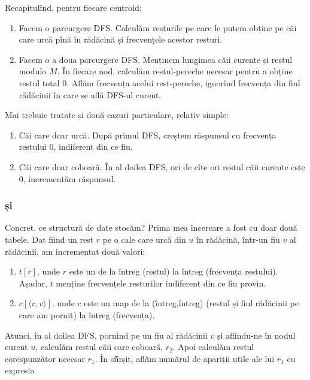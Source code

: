 \documentclass[../main.tex]{subfiles}
\begin{document}
Recapitulînd, pentru fiecare centroid:

\begin{enumerate}
  \item Facem o parcurgere DFS. Calculăm resturile pe care le putem obține pe căi care urcă pînă în rădăcină și frecvențele acestor resturi.

  \item Facem o a doua parcurgere DFS. Menținem lungimea căii curente și restul modulo $M$. În fiecare nod, calculăm restul-pereche necesar pentru a obține restul total 0. Aflăm frecvența acelui rest-pereche, ignorînd frecvența din fiul rădăcinii în care se află DFS-ul curent.
\end{enumerate}

Mai trebuie tratate și două cazuri particulare, relativ simple:

\begin{enumerate}
  \item Căi care doar urcă. După primul DFS, creștem răspunsul cu frecvența restului 0, indiferent din ce fiu.

  \item Căi care doar coboară. În al doilea DFS, ori de cîte ori restul căii curente este 0, incrementăm răspunsul.
\end{enumerate}

\subsubsection*{ și }

Concret, ce structură de date stocăm? Prima mea încercare a fost cu doar două tabele. Dat fiind un rest $r$ pe o cale care urcă din $u$ în rădăcină, într-un fiu $v$ al rădăcinii, am incrementat două valori:

\begin{enumerate}
  \item $t[r]$, unde $r$ este un  de la întreg (restul) la întreg (frecvența restului). Așadar, $t$ menține frecvențele resturilor indiferent din ce fiu provin.

  \item $c[\langle r, v \rangle]$, unde $c$ este un map de la (întreg,întreg) (restul și fiul rădăcinii pe care am pornit) la întreg (frecvența).
\end{enumerate}

Atunci, în al doilea DFS, pornind pe un fiu al rădăcinii $v$ și aflîndu-ne în nodul curent $u$, calculăm restul căii care coboară, $r_2$. Apoi calculăm restul corespunzător necesar $r_1$. În sfîrșit, aflăm numărul de apariții utile ale lui $r_1$ cu expresia
\end{document}
